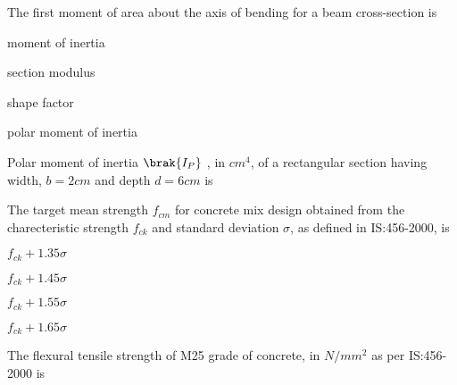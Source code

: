 \item The first moment of area about the axis of bending for a beam cross-section is
   \begin{enumerate}
        \begin{multicols}{2}
        \item moment of inertia
        \item section modulus
        \item shape factor
        \item polar moment of inertia 
        \end{multicols}
    \end{enumerate}

\item Polar moment of inertia $\brak{I_{P}}$ , in $cm^{4}$, of a rectangular section having width, $ b = 2 cm $ and depth $ d = 6 cm $  is \underline{\hspace{2cm}} 
\item The target mean strength $f_{cm}$ for concrete mix design obtained from the charecteristic strength $f_{ck}$  and standard deviation $\sigma$, as defined in IS:456-2000, is
    \begin{enumerate}
        \begin{multicols}{2}
            \item $f_{ck} + 1.35 \sigma $
            \item $f_{ck} + 1.45 \sigma $
            \item $f_{ck} + 1.55 \sigma $
            \item $f_{ck} + 1.65 \sigma $
        \end{multicols}
    \end{enumerate}

\item The flexural tensile strength of M25 grade of concrete, in $N/mm^{2}$ as per IS:456-2000 is \underline{\hspace {1 cm}}




